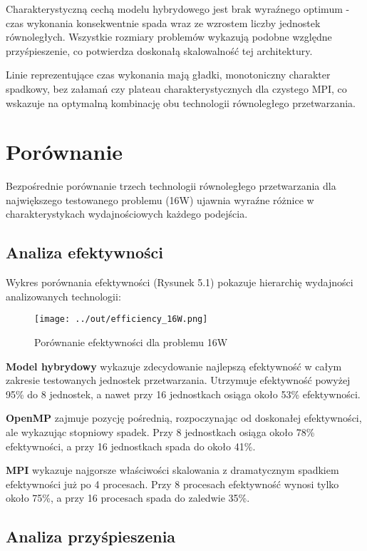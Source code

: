 \documentclass[12pt,a4paper]{report}
\begin{document}
Charakterystyczną cechą modelu hybrydowego jest brak wyraźnego optimum - czas wykonania konsekwentnie spada wraz ze wzrostem liczby jednostek równoległych. Wszystkie rozmiary problemów wykazują podobne względne przyśpieszenie, co potwierdza doskonałą skalowalność tej architektury.

Linie reprezentujące czas wykonania mają gładki, monotoniczny charakter spadkowy, bez załamań czy plateau charakterystycznych dla czystego MPI, co wskazuje na optymalną kombinację obu technologii równoległego przetwarzania.

\chapter{Porównanie}

Bezpośrednie porównanie trzech technologii równoległego przetwarzania dla największego testowanego problemu (16W) ujawnia wyraźne różnice w charakterystykach wydajnościowych każdego podejścia.

\section{Analiza efektywności}

Wykres porównania efektywności (Rysunek 5.1) pokazuje hierarchię wydajności analizowanych technologii:

\begin{figure}[h]
    \centering
    \texttt{[image: ../out/efficiency\_16W.png]}
    \caption{Porównanie efektywności dla problemu 16W}
    \label{fig:comparison_efficiency}
\end{figure}

\textbf{Model hybrydowy} wykazuje zdecydowanie najlepszą efektywność w całym zakresie testowanych jednostek przetwarzania. Utrzymuje efektywność powyżej 95\% do 8 jednostek, a nawet przy 16 jednostkach osiąga około 53\% efektywności.

\textbf{OpenMP} zajmuje pozycję pośrednią, rozpoczynając od doskonałej efektywności, ale wykazując stopniowy spadek. Przy 8 jednostkach osiąga około 78\% efektywności, a przy 16 jednostkach spada do około 41\%.

\textbf{MPI} wykazuje najgorsze właściwości skalowania z dramatycznym spadkiem efektywności już po 4 procesach. Przy 8 procesach efektywność wynosi tylko około 75\%, a przy 16 procesach spada do zaledwie 35\%.

\section{Analiza przyśpieszenia}
\end{document}
